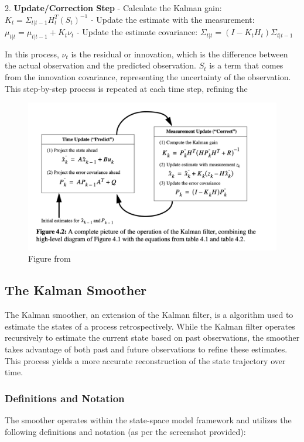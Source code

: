 \documentclass{article}
\begin{document}
2. \textbf{Update/Correction Step}
   - Calculate the Kalman gain: \( K_t = \Sigma_{t|t-1}H_t^T(S_t)^{-1} \)
   - Update the estimate with the measurement: \( \mu_{t|t} = \mu_{t|t-1} + K_t\nu_t \)
   - Update the estimate covariance: \( \Sigma_{t|t} = (I - K_tH_t)\Sigma_{t|t-1} \)

In this process, \( \nu_t \) is the residual or innovation, which is the difference between the actual observation and the predicted observation. \( S_t \) is a term that comes from the innovation covariance, representing the uncertainty of the observation. This step-by-step process is repeated at each time step, refining the 
\begin{figure}
    \centering
    \includegraphics[width=1\linewidth]{overviews/HMM/figures/Filter visuals.png}
    \caption{Figure from \cite{welch_introduction_nodate} }
    \label{fig:enter-label}
\end{figure}

\subsection{The Kalman Smoother}

The Kalman smoother, an extension of the Kalman filter, is a  algorithm used to estimate the states of a process retrospectively. While the Kalman filter operates recursively to estimate the current state based on past observations, the smoother takes advantage of both past and future observations to refine these estimates. This process yields a more accurate reconstruction of the state trajectory over time.

\subsubsection{Definitions and Notation}
The smoother operates within the state-space model framework and utilizes the following definitions and notation (as per the screenshot provided):
\end{document}
